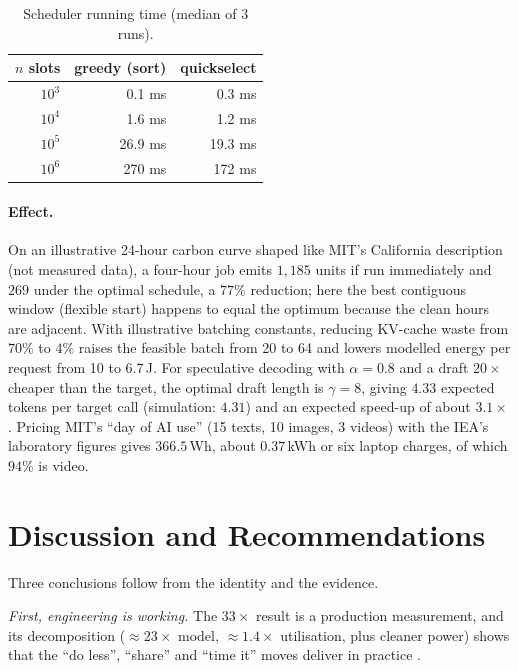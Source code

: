 \documentclass[11pt]{article}
\theoremstyle{definition}
\theoremstyle{remark}
\begin{document}
\begin{table}[h]
\centering\small
\caption{Scheduler running time (median of 3 runs).}
\label{tab:bench}
\begin{tabular}{@{}rrr@{}}
\toprule
$n$ slots & greedy (sort) & quickselect \\
\midrule
$10^3$ & 0.1 ms & 0.3 ms \\
$10^4$ & 1.6 ms & 1.2 ms \\
$10^5$ & 26.9 ms & 19.3 ms \\
$10^6$ & 270 ms & 172 ms \\
\bottomrule
\end{tabular}
\end{table}

\paragraph{Effect.} On an illustrative 24-hour carbon curve shaped like MIT's California description (not measured data), a four-hour job emits $1{,}185$ units if run immediately and $269$ under the optimal schedule, a $77\%$ reduction; here the best contiguous window (flexible start) happens to equal the optimum because the clean hours are adjacent. With illustrative batching constants, reducing KV-cache waste from $70\%$ to $4\%$ raises the feasible batch from 20 to 64 and lowers modelled energy per request from 10 to 6.7\,J. For speculative decoding with $\alpha=0.8$ and a draft $20\times$ cheaper than the target, the optimal draft length is $\gamma=8$, giving $4.33$ expected tokens per target call (simulation: $4.31$) and an expected speed-up of about $3.1\times$. Pricing MIT's ``day of AI use'' (15 texts, 10 images, 3 videos) with the IEA's laboratory figures gives $366.5$\,Wh, about $0.37$\,kWh or six laptop charges, of which $94\%$ is video.

\section{Discussion and Recommendations}\label{sec:policy}

Three conclusions follow from the identity and the evidence.

\emph{First, engineering is working.} The $33\times$ result is a production measurement, and its decomposition ($\approx 23\times$ model, $\approx 1.4\times$ utilisation, plus cleaner power) shows that the ``do less'', ``share'' and ``time it'' moves deliver in practice \citep{elsworth2025}.
\end{document}
